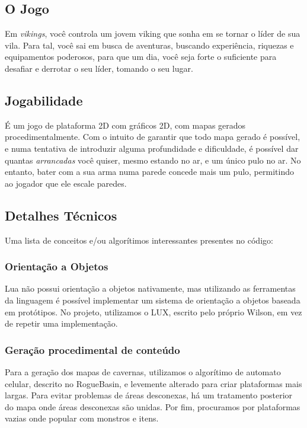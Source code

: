   \subsection{O Jogo}
    Em \textit{vikings}, você controla um jovem viking que sonha em se tornar o líder de sua vila. Para tal,
    você sai em busca de aventuras, buscando experiência, riquezas e equipamentos poderosos, para que um dia,
    você seja forte o suficiente para desafiar e derrotar o seu líder, tomando o seu lugar.
        
  \subsection{Jogabilidade}
    É um jogo de plataforma 2D com gráficos 2D, com mapas gerados procedimentalmente. Com o intuito de garantir
    que todo mapa gerado é possível, e numa tentativa de introduzir alguma profundidade e dificuldade, é
    possível dar quantas \textit{arrancadas} você quiser, mesmo estando no ar, e um único pulo no ar. No
    entanto, bater com a sua arma numa parede concede mais um pulo, permitindo ao jogador que ele escale
    paredes.
    
  \subsection{Detalhes Técnicos}
    Uma lista de conceitos e/ou algorítimos interessantes presentes no código:
    
    \subsubsection{Orientação a Objetos}
      Lua não possui orientação a objetos nativamente, mas utilizando as ferramentas da linguagem é possível
      implementar um sistema de orientação a objetos baseada em protótipos.
      No projeto, utilizamos o LUX\footnotemark{}, escrito pelo próprio Wilson, em vez de repetir uma implementação.
      
    
    \subsubsection{Geração procedimental de conteúdo}
      Para a geração dos mapas de cavernas, utilizamos o algorítimo de automato celular, descrito no RogueBasin,
      \cite{roguebasin:cellularautomata} e levemente alterado para criar plataformas mais largas. Para
      evitar problemas de áreas desconexas, há um tratamento posterior do mapa onde áreas desconexas são unidas.
      Por fim, procuramos por plataformas vazias onde popular com monstros e itens.